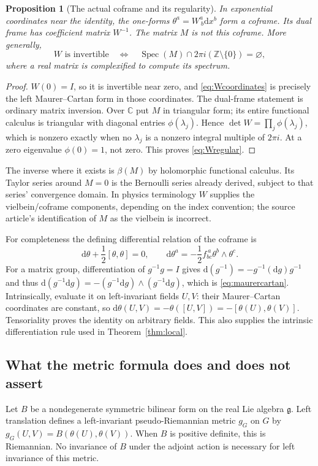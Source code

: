 \documentclass[11pt]{article}
\newtheorem{proposition}[theorem]{Proposition}
\theoremstyle{definition}
\theoremstyle{remark}
\newcommand{\C}{\mathbb C}
\newcommand{\g}{\mathfrak g}
\newcommand{\dd}{\mathrm d}
\newcommand{\Spec}{\operatorname{Spec}}
\numberwithin{equation}{section}
\begin{document}
\begin{proposition}[The actual coframe and its regularity]\label{prop:coframe}
In exponential coordinates near the identity, the one-forms
$\theta^a=W^a_{\ b}\dd x^b$ form a coframe. Its dual frame has coefficient matrix $W^{-1}$. The matrix $M$ is not this coframe. More generally,
\begin{equation}\label{eq:Wregular}
 W\text{ is invertible}\quad\Longleftrightarrow\quad
 \Spec(M)\cap2\pi i(\mathbb Z\setminus\{0\})=\varnothing,
\end{equation}
where a real matrix is complexified to compute its spectrum.
\end{proposition}
\begin{proof}
$W(0)=I$, so it is invertible near zero, and \eqref{eq:Wcoordinates} is precisely the left Maurer--Cartan form in those coordinates. The dual-frame statement is ordinary matrix inversion. Over $\C$ put $M$ in triangular form; its entire functional calculus is triangular with diagonal entries $\phi(\lambda_j)$. Hence $\det W=\prod_j\phi(\lambda_j)$, which is nonzero exactly when no $\lambda_j$ is a nonzero integral multiple of $2\pi i$. At a zero eigenvalue $\phi(0)=1$, not zero. This proves \eqref{eq:Wregular}.
\end{proof}
The inverse where it exists is $\beta(M)$ by holomorphic functional calculus. Its Taylor series around $M=0$ is the Bernoulli series already derived, subject to that series' convergence domain. In physics terminology $W$ supplies the vielbein/coframe components, depending on the index convention; the source article's identification of $M$ as the vielbein is incorrect.

For completeness the defining differential relation of the coframe is
\begin{equation}\label{eq:maurercartan}
 \dd\theta+\frac12[\theta,\theta]=0,
 \qquad
 \dd\theta^a=-\frac12f_{bc}^{\ a}\theta^b\wedge\theta^c.
\end{equation}
For a matrix group, differentiation of $g^{-1}g=I$ gives
$\dd(g^{-1})=-g^{-1}(\dd g)g^{-1}$ and thus
$\dd(g^{-1}\dd g)=-(g^{-1}\dd g)\wedge(g^{-1}\dd g)$, which is \eqref{eq:maurercartan}. Intrinsically, evaluate it on left-invariant fields $U,V$: their Maurer--Cartan coordinates are constant, so $\dd\theta(U,V)=-\theta([U,V])=-[\theta(U),\theta(V)]$. Tensoriality proves the identity on arbitrary fields. This also supplies the intrinsic differentiation rule used in Theorem~\ref{thm:local}.

\subsection{What the metric formula does and does not assert}
Let $B$ be a nondegenerate symmetric bilinear form on the real Lie algebra $\g$. Left translation defines a left-invariant pseudo-Riemannian metric $g_G$ on $G$ by
$g_G(U,V)=B(\theta(U),\theta(V))$. When $B$ is positive definite, this is Riemannian. No invariance of $B$ under the adjoint action is necessary for left invariance of this metric.
\end{document}
